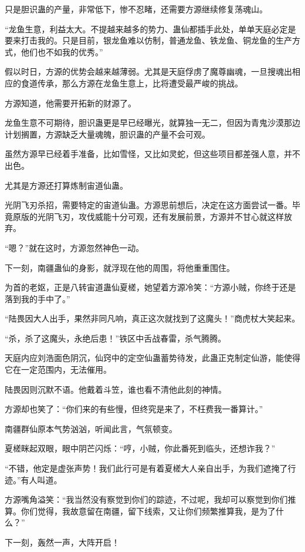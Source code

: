 \begin{this_body}
只是胆识蛊的产量，非常低下，惨不忍睹，还需要方源继续修复荡魂山。

“龙鱼生意，利益太大。不提越来越多的势力、蛊仙都插手此处，单单天庭必定是要来打击我的。只是目前，银龙鱼难以仿制，普通龙鱼、铁龙鱼、铜龙鱼的生产方式，他们也不如我的优秀。”

假以时日，方源的优势会越来越薄弱。尤其是天庭俘虏了魔尊幽魂，一旦搜魂出相应的食道传承，那么方源在龙鱼生意上，比将遭受最严峻的挑战。

方源知道，他需要开拓新的财源了。

龙鱼生意不可期待，胆识蛊更是早已经曝光，就算独一无二，但因为青鬼沙漠那边计划搁置，方源缺乏大量魂魄，胆识蛊的产量不会可观。

虽然方源早已经着手准备，比如雪怪，又比如灵蛇，但这些项目都差强人意，并不出色。

尤其是方源还打算炼制宙道仙蛊。

光阴飞刃杀招，需要特定的宙道仙蛊。方源思前想后，决定在这方面尝试一番。毕竟原版的光阴飞刃，攻伐威能十分可观，还有发展前景，方源并不甘心就这样放弃。

“嗯？”就在这时，方源忽然神色一动。

下一刻，南疆蛊仙的身影，就浮现在他的周围，将他重重围住。

为首的老妪，正是八转宙道蛊仙夏槎，她望着方源冷笑：“方源小贼，你终于还是落到我的手中了。”

“陆畏因大人出手，果然非同凡响，真正这次就找到了这魔头！”商虎杖大笑起来。

“杀，杀了这魔头，永绝后患！”铁区中舌战春雷，杀气腾腾。

天庭内应刘浩面色阴沉，仙窍中的定空仙蛊蓄势待发，此蛊正克制定仙游，能使得它在一定范围内，无法催用。

陆畏因则沉默不语。他戴着斗笠，谁也看不清他此刻的神情。

方源却也笑了：“你们来的有些慢，但终究是来了，不枉费我一番算计。”

南疆群仙原本气势汹汹，听闻此言，气氛顿变。

夏槎眯起双眼，眼中阴芒闪烁：“哼，小贼，你此番死到临头，还想诈我？”

“不错，他定是虚张声势！我们此行可是有着夏槎大人亲自出手，为我们遮掩了行迹。”有人叫道。

方源嘴角溢笑：“我当然没有察觉到你们的踪迹，不过呢，我却可以察觉到你们推算。你们觉得，我故意留在南疆，留下线索，又让你们频繁推算我，是为了什么？”

下一刻，轰然一声，大阵开启！

\end{this_body}

